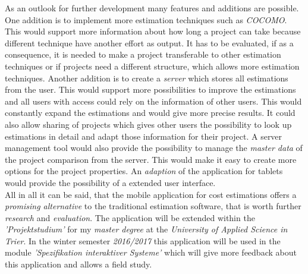 As an outlook for further development many features and additions are possible. One addition is to implement more estimation techniques such as \textit{COCOMO}. This would support more information about how long a project can take because different technique have another effort as output. It has to be evaluated, if as a consequence, it is needed to make a project transferable to other estimation techniques or if projects need a different structure, which allows more estimation techniques. Another addition is to create a \textit{server} which stores all estimations from the user. This would support more possibilities to improve the estimations and all users with access could rely on the information of other users. This would constantly expand the estimations and would give more precise results. It could also allow sharing of projects which gives other users the possibility to look up estimations in detail and adapt those information for their project. A server management tool would also provide the possibility to manage the \textit{master data} of the project comparison from the server. This would make it easy to create more options for the project properties. An \textit{adaption} of the application for tablets would provide the possibility of a extended user interface.\\
All in all it can be said, that the mobile application for cost estimations offers a \textit{promising alternative} to the traditional estimation software, that is worth further \textit{research} and \textit{evaluation}. The application will be extended within the \textit{'Projektstudium'} for my \textit{master degree} at the \textit{University of Applied Science in Trier}. In the winter semester \textit{2016/2017} this application will be used in the module \textit{'Spezifikation interaktiver Systeme'} which will give more feedback about this application and allows a field study.